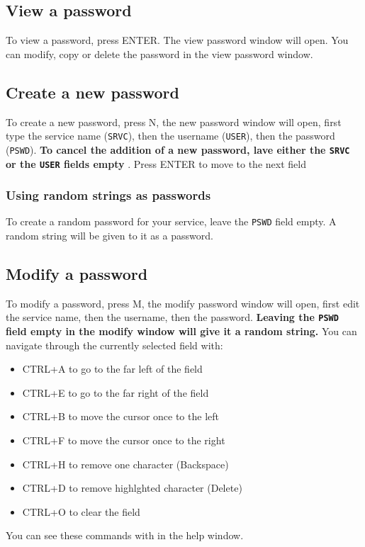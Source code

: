 \documentclass{article}
\begin{document}
  \subsection{View a password}
  To view a password, press ENTER. The view password window will open. You can modify, copy or delete the password in the view password window.

  \subsection{Create a new password}
  To create a new password, press N, the new password window will open, first type the service name (\texttt{SRVC}), then the username (\texttt{USER}),
  then the password (\texttt{PSWD}). \textbf{To cancel the addition of a new password, lave either the \texttt{SRVC} or the \texttt{USER} fields
  empty }. Press ENTER to move to the next field

  \subsubsection{Using random strings as passwords}
  To create a random password for your service, leave the \texttt{PSWD} field empty. A random string will be given to it as a password.

  \subsection{Modify a password}
  To modify a password, press M, the modify password window will open, first edit the service name, then the username,
  then the password. \textbf{Leaving the \texttt{PSWD} field empty in the modify window will give it a random string.}
  You can navigate through the currently selected field with:
  \begin{itemize}
    \item CTRL+A to go to the far left of the field  
    \item CTRL+E to go to the far right of the field
    \item CTRL+B to move the cursor once to the left
    \item CTRL+F to move the cursor once to the right
    \item CTRL+H to remove one character (Backspace)
    \item CTRL+D to remove highlghted character (Delete)
    \item CTRL+O to clear the field
  \end{itemize}
  You can see these commands with in the help window.
\end{document}
